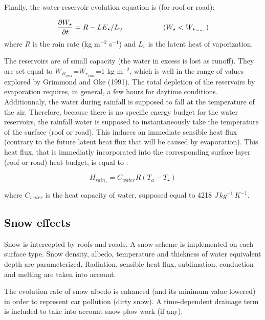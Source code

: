Finally, the water-reservoir evolution equation is (for roof or road):

\begin{equation}
\frac{\partial W_\star}{\partial t} = R - LE_\star / L_v 
\hspace*{2.cm}(W_\star < W_{\star_{max}})
\end{equation}
where $R$ is the rain rate (kg m$^{-2}$ s$^{-1}$)
and $L_v$ is the latent heat of vaporization.

The reservoirs are of small capacity (the water in excess is lost as runoff). 
They are set equal to $W_{R_{max}}$=$W_{r_{max}}$=1 kg m$^{-2}$, which is well
in the range of values explored by Grimmond and Oke (1991).
The total depletion of the reservoirs by evaporation requires, in general,
a few hours for daytime conditions.\\

Additionnaly, the water during rainfall is supposed to fall at the temperature of the air. Therefore, because there is no specific energy budget for the water reservoirs, the rainfall water is supposed to instantaneously take the temperature of the surface (roof or road). This induces an immediate sensible heat flux (contrary to the future latent heat flux that will be caused by evaporation). This heat flux, that is immediatly incorporated into the corresponding surface layer (roof or road) heat budget, is equal to :

\begin{equation}
H_{{rain}_\star} = C_{water} R (T_a - T_\star)
\end{equation}

where $C_{water}$ is the heat capacity of water, supposed equal to 4218 $J\,kg^{-1}\,K^{-1}$.


\subsection{Snow effects}

Snow is intercepted by roofs and roads. A snow
scheme is implemented on each surface type. Snow density, albedo, temperature
and thickness of water equivalent depth are parameterized. Radiation, sensible heat flux, sublimation, conduction
and melting are taken into account.

The evolution rate of snow albedo is enhanced (and its minimum value lowered)
in order to represent car pollution (dirty snow).
A time-dependent drainage term is included to take into account
snow-plow work (if any).

